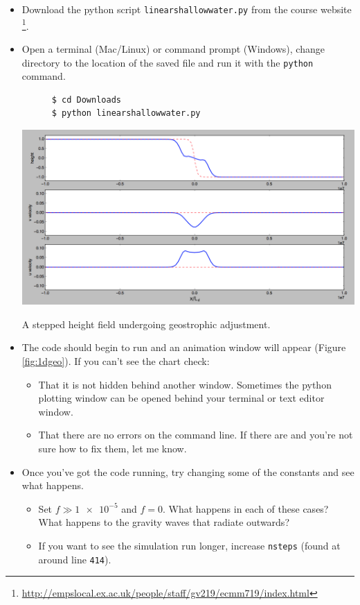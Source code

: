 \documentclass[a4paper, sfsidenotes, twoside]{tufte-handout}
\begin{document}
  \begin{itemize}
    \item Download the python script \texttt{linearshallowwater.py} from the
    course website \footnote{\url{http://empslocal.ex.ac.uk/people/staff/gv219/ecmm719/index.html}}.
    \item Open a terminal (Mac/Linux) or command prompt (Windows), change directory to the location of the saved file and run it with the \texttt{python} command.
    \begin{verbatim}
      $ cd Downloads
      $ python linearshallowwater.py
    \end{verbatim}
    \begin{marginfigure}
      \includegraphics{geostrophy}
      \caption{A stepped height field undergoing geostrophic adjustment.}
      \label{fig:1dgeo}
    \end{marginfigure}
    \item The code should begin to run and an animation window will appear (Figure \ref{fig:1dgeo}).  If you can't see the chart check:
    \begin{itemize}
      \item That it is not hidden behind another window.  Sometimes the python plotting window can be opened behind your terminal or text editor window.
      \item That there are no errors on the command line.  If there are and you're not sure how to fix them, let me know.
    \end{itemize}
    \item Once you've got the code running, try changing some of the constants and see what happens.
    \begin{itemize}
      \item Set $f \gg \num{1e-5}$ and $f = \num{0}$. What happens in each of these cases? What happens to the gravity waves that radiate outwards?
      \item If you want to see the simulation run longer, increase \texttt{nsteps} (found at around line \texttt{414}).
    \end{itemize}
  \end{itemize}
\end{document}
